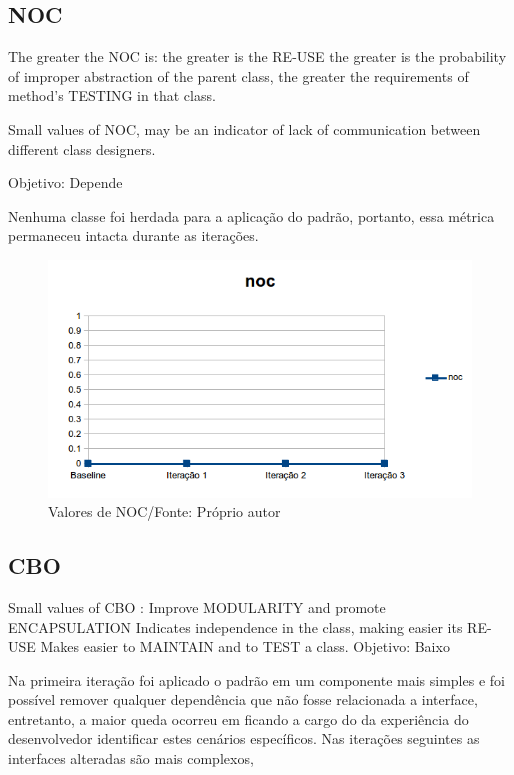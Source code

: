 \subsection{NOC}

The greater the NOC is:
 the greater is the RE-USE
 the greater is the probability of improper abstraction of the parent class,
 the greater the requirements of method's TESTING in that class.

Small values of NOC, may be an indicator of lack of communication between different class designers.

Objetivo: Depende


Nenhuma classe foi herdada para a aplicação do padrão, portanto, essa métrica
permaneceu intacta durante as iterações.

\begin{figure}[h]
	\centering
	\includegraphics{img/noc.png}
	\caption{Valores de NOC/Fonte: Próprio autor}
	\label{fig:noc}
\end{figure}

\subsection{CBO}


Small values of CBO :
Improve MODULARITY and promote ENCAPSULATION
Indicates independence in the class, making easier its RE-USE
Makes easier to MAINTAIN and to TEST a class.
Objetivo: Baixo


Na primeira iteração foi aplicado o padrão em um componente mais simples e foi
possível remover qualquer dependência que não fosse relacionada a interface,
entretanto, a maior queda ocorreu em  ficando a cargo do da experiência do
desenvolvedor identificar estes cenários específicos. Nas iterações seguintes as
interfaces alteradas são mais complexos,


